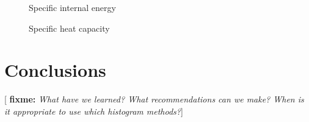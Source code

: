 \documentclass[11pt]{article}
\newcommand{\red}[1]{{\bf \color{red} #1}}
\newcommand{\fixme}[1]{[\red{fixme:} \emph{#1}]}
\begin{document}
\begin{figure}[H]
  \centering
  \caption[Specific internal energy]{Specific internal energy}
  \label{fig:internal_energy}
\end{figure}

\begin{figure}[H]
  \centering
  \caption[Specific heat capacity]{Specific heat capacity}
  \label{fig:heat_capacity}
\end{figure}


\section{Conclusions}
\label{sec:conclusions}

\fixme{What have we learned? What recommendations can we make? When is
  it appropriate to use which histogram methods?}


\nocite{*} 
\end{document}
